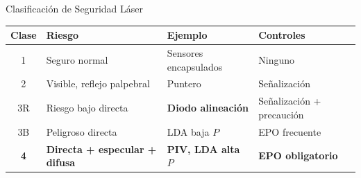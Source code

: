 \documentclass[aspectratio=169,12pt]{beamer}
\begin{document}
\begin{frame}{Clasificación de Seguridad Láser}
	\centering
	\small
	\begin{tabular}{clll}
		\toprule
		\textbf{Clase} & \textbf{Riesgo}                       & \textbf{Ejemplo}           & \textbf{Controles}        \\
		\midrule
		1              & Seguro normal                         & Sensores encapsulados      & Ninguno                   \\
		2              & Visible, reflejo palpebral            & Puntero                    & Señalización              \\
		\rowcolor{aeroyellow!30}
		3R             & Riesgo bajo directa                   & \textbf{Diodo alineación}  & Señalización + precaución \\
		3B             & Peligroso directa                     & LDA baja $P$               & EPO frecuente             \\
		\rowcolor{aerored!25}
		\textbf{4}     & \textbf{Directa + especular + difusa} & \textbf{PIV, LDA alta $P$} & \textbf{EPO obligatorio}  \\
		\bottomrule
	\end{tabular}

	\vspace{0.5cm}
\end{frame}
\end{document}
